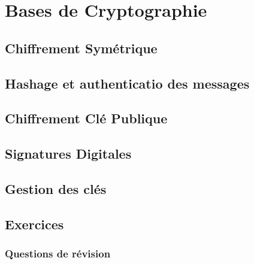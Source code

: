 \documentclass{report}
\begin{document}

\chapter{Bases de Cryptographie}

	\section{Chiffrement Symétrique}

	\section{Hashage et authenticatio des messages}

	\section{Chiffrement Clé Publique}

	\section{Signatures Digitales}

	\section{Gestion des clés}
	
	\section{Exercices}

		\subsection{Questions de révision}
\end{document}
